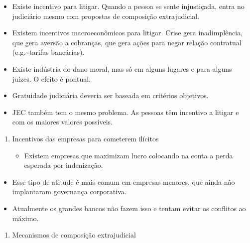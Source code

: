 \documentclass[]{report}
\providecommand{\tightlist}{%
  \setlength{\itemsep}{0pt}\setlength{\parskip}{0pt}}
\begin{document}
\begin{itemize}
\tightlist
\item
  Existe incentivo para litigar. Quando a pessoa se sente injustiçada,
  entra no judiciário mesmo com propostas de composição extrajudicial.
\item
  Existem incentivos macroeconômicos para litigar. Crise gera
  inadimplência, que gera aversão a cobranças, que gera ações para negar
  relação contratual (e.g.\textasciitilde{}tarifas bancárias).
\item
  Existe indústria do dano moral, mas só em alguns lugares e para alguns
  juízes. O efeito é pontual.
\item
  Gratuidade judiciária deveria ser baseada em critérios objetivos.
\item
  JEC também tem o mesmo problema. As pessoas têm incentivo a litigar e
  com os maiores valores possíveis.
\end{itemize}

\begin{enumerate}
\def\labelenumi{\arabic{enumi}.}
\tightlist
\item
  Incentivos das empresas para cometerem ilícitos

  \begin{itemize}
  \tightlist
  \item
    Existem empresas que maximizam lucro colocando na conta a perda
    esperada por indenização.
  \end{itemize}
\end{enumerate}

\begin{itemize}
\tightlist
\item
  Esse tipo de atitude é mais comum em empresas menores, que ainda não
  implantaram governança corporativa.
\item
  Atualmente os grandes bancos não fazem isso e tentam evitar os
  conflitos ao máximo.
\end{itemize}

\begin{enumerate}
\def\labelenumi{\arabic{enumi}.}
\tightlist
\item
  Mecanismos de composição extrajudicial
\end{enumerate}
\end{document}
